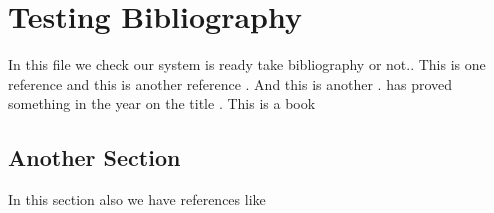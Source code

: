 \documentclass{article}
\begin{document}
	\section{Testing Bibliography}
	In this file we check our system is ready take bibliography or not..
This is one reference \parencite{davidLatex} and this is another reference \cite{einstein}. And this is another \cite{lamport1994latex}.  \citeauthor{einstein} has proved something in the year \citeyear{einstein} on the title . This is a book \cite{latexcompanion}

\begin{refsection}
\section{Another Section}

In this section also we have references like \cite{einstein}
\printbibliography[title={Current Section References}]
\end{refsection}

\printbibliography[type=article, title=Article References]

\newrefcontext[labelprefix=B]
\printbibliography[type=book, title=Book References]
\end{document}
